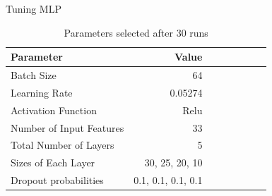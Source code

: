 \documentclass{beamer}
\begin{document}
    \begin{frame}{Tuning MLP}
    \begin{table}[h]
        \centering
        \caption{Parameters selected after 30 runs}
        \label{table:Parameters of the best MLP model}
    
        \begin{tabular}{lrrrrrrr}
        \toprule
              \textbf{Parameter} & \textbf{Value} \\
        \midrule
        Batch Size & 64\\
        Learning Rate & 0.05274\\
        Activation Function & Relu \\
        Number of Input Features & 33 \\
        Total Number of Layers & 5 \\
        Sizes of Each Layer & 30, 25, 20, 10 \\
        Dropout probabilities & 0.1, 0.1, 0.1, 0.1 \\
        \bottomrule
        \end{tabular}
    \end{table}
    \end{frame}
    
\end{document}
